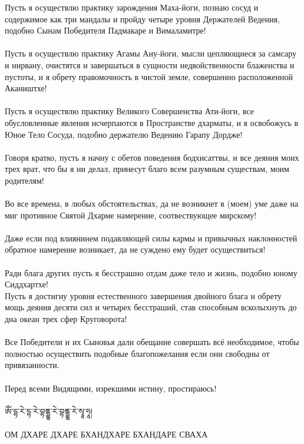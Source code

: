 Пусть я осуществлю практику зарождения Маха-йоги,
познаю сосуд и содержимое как три мандалы и пройду четыре
уровня Держателей Ведения, подобно Сынам Победителя
Падмакаре и Вималамитре!\\
\\
Пусть я осуществлю практику Агамы Ану-йоги, мысли
цепляю\-щиеся за самсару и нирвану, очистятся и завершаться
в сущности недвойственности блаженства и пустоты,
и я обрету правомочность в чистой земле, совершенно расположенной Акаништхе!\\
\\
Пусть я осуществлю практику Великого Совершенства Ати-йоги,
все обусловленные явления исчерпаются в Пространстве дхарматы,
и я освобожусь в Юное Тело Сосуда, подобно держателю Ведению Гарапу Дордже!\\
\\
Говоря кратко, пусть я начну с обетов поведения бодхисаттвы,
и все деяния моих трех врат, что бы я ни делал,
принесут благо всем разумным существам, моим родителям!\\
\\
Во все времена, в любых обстоятельствах, да не возникнет
в (моем) уме даже на миг противное Святой Дхарме намерение, соотвествующее мирскому!\\
\\
Даже если под влиянинем подавляющей силы кармы и привыч\-ных наклонностей 
обратное намерение возникает, да не сужде\-но ему будет осуществиться!\\
\\
Ради блага других пусть я бесстрашно отдам даже тело и жизнь, подобно юному Сиддхартхе!\\
\newpage
Пусть я достигну уровня естественного завершения двойного блага 
и обрету мощь деяния десяти сил и четырех бесстраший,
став способным всколыхнуть до дна океан трех сфер Кругово\-рота!\\
\\
Все Победители и их Сыновья дали обещание совершать всё необходимое,
чтобы полностью осуществить подобные благопожелания
если они свободны от привязанности.\\
\\
Перед всеми Видящими, изрекшими истину, простираюсь!
\\
\\
\ti
ཨོཾ་དྷ་རེ་དྷ་རེ་བྷནྡྷ་རེ་བྷནྡྷ་རེ་སྭཱ་ཧཱ། \\
\\
\ru 
ОМ ДХАРЕ ДХАРЕ БХАНДХАРЕ БХАНДАРЕ СВАХА\\
\\
